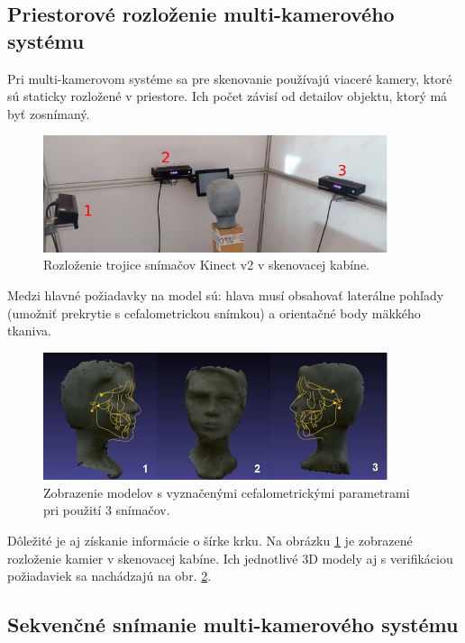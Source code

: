 \subsection{Priestorové rozloženie multi-kamerového systému}

Pri multi-kamerovom systéme sa pre skenovanie používajú viaceré kamery, ktoré sú staticky rozložené v priestore. Ich počet závisí od detailov objektu, ktorý má byť zosnímaný.

\begin{figure}[H]
	\centering
	\includegraphics[width=0.9\textwidth]{figures/multicam_placement.png}
	\caption{Rozloženie trojice snímačov Kinect v2 v skenovacej kabíne.}
	\label{fig:multicam:placement}
\end{figure}

Medzi hlavné požiadavky na model sú: hlava musí obsahovať laterálne pohľady (umožniť prekrytie s cefalometrickou snímkou) a orientačné body mäkkého tkaniva.

\begin{figure}[H]
	\centering
	\includegraphics[width=0.9\textwidth]{figures/multicam_placement_scans3.png}
	\caption{Zobrazenie modelov s vyznačenými cefalometrickými parametrami pri použití 3 snímačov. }
	\label{fig:multicam:models}
\end{figure}

Dôležité je aj získanie informácie o šírke krku. Na obrázku \ref{fig:multicam:placement} je zobrazené rozloženie kamier v skenovacej kabíne. Ich jednotlivé 3D modely aj s verifikáciou požiadaviek sa nachádzajú na obr. \ref{fig:multicam:models}. 



\subsection{Sekvenčné snímanie multi-kamerového systému}

